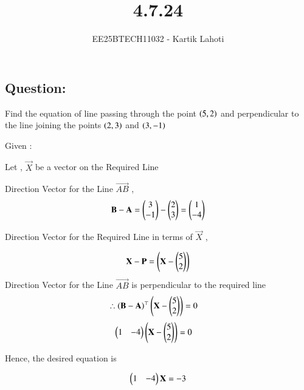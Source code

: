 \documentclass[journal]{IEEEtran}
\numberwithin{equation}{enumi}
\numberwithin{figure}{enumi}
\begin{document}

\vspace{3cm}

\title{4.7.24}
\author{EE25BTECH11032 - Kartik Lahoti}
\maketitle

\subsection*{Question: } 
Find the equation of line passing through the point $\left(5,2\right)$ and perpendicular to the line joining the points $\left(2,3\right)$ and $\left(3,-1\right)$

\solution 

Given : 
\begin{table}[H]
    \centering
    
    \caption*{}
    \label{tab:placeholder_1}
\end{table}

Let , $\vec{X}$ be a vector on the Required Line

Direction Vector for the Line $\vec{AB}$ , 
\begin{align}
    \mathbf{B} - \mathbf{A} = \begin{pmatrix}3 \\ -1\end{pmatrix} - \begin{pmatrix}2 \\ 3\end{pmatrix} = \begin{pmatrix}1 \\ -4\end{pmatrix}
\end{align}

Direction Vector for the Required Line in terms of $\vec{X}$ , 

\begin{align}
    \mathbf{X} - \mathbf{P} = \left(\mathbf{X} - \begin{pmatrix}5 \\ 2\end{pmatrix}\right)
\end{align}
Direction Vector for the Line $\vec{AB}$ is perpendicular to the required line
\begin{align}
        \therefore \left(\mathbf{B} - \mathbf{A}\right)^{\top}\left(\mathbf{X} - \begin{pmatrix}5 \\ 2\end{pmatrix}\right) &= 0
\end{align}
\begin{align}
    \begin{pmatrix}1 & -4\end{pmatrix}\left(\mathbf{X} - \begin{pmatrix}5 \\ 2\end{pmatrix}\right) &= 0
\end{align}

Hence, the desired equation is 

\begin{align}
    \begin{pmatrix}1 & -4\end{pmatrix}\mathbf{X} = -3
\end{align}
\end{document}

